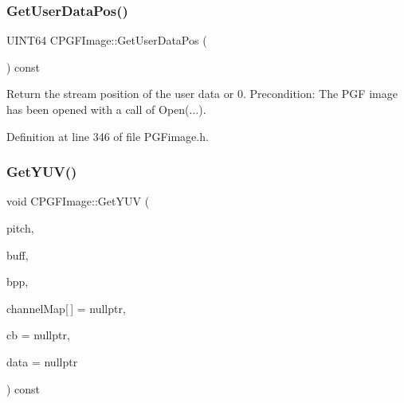 \subsubsection{\texorpdfstring{GetUserDataPos()}{GetUserDataPos()}}
{\footnotesize\ttfamily U\+I\+N\+T64 C\+P\+G\+F\+Image\+::\+Get\+User\+Data\+Pos (\begin{DoxyParamCaption}{ }\end{DoxyParamCaption}) const\hspace{0.3cm}{\ttfamily [inline]}}

Return the stream position of the user data or 0. Precondition\+: The P\+GF image has been opened with a call of Open(...). 

Definition at line 346 of file P\+G\+Fimage.\+h.


\begin{DoxyCode}{0}

\end{DoxyCode}
\mbox{\label{classCPGFImage_a37c2f9a6b99c0e0b3564433e21f88e9b}} 
\subsubsection{\texorpdfstring{GetYUV()}{GetYUV()}}
{\footnotesize\ttfamily void C\+P\+G\+F\+Image\+::\+Get\+Y\+UV (\begin{DoxyParamCaption}\item[{int}]{pitch,  }\item[{\mbox{\hyperlink{PGFtypes_8h_acb1ee3f52ccfad782dcaa0abd79e5d05}{DataT}} $\ast$}]{buff,  }\item[{B\+Y\+TE}]{bpp,  }\item[{int}]{channel\+Map\mbox{[}$\,$\mbox{]} = {\ttfamily nullptr},  }\item[{Callback\+Ptr}]{cb = {\ttfamily nullptr},  }\item[{void $\ast$}]{data = {\ttfamily nullptr} }\end{DoxyParamCaption}) const}

